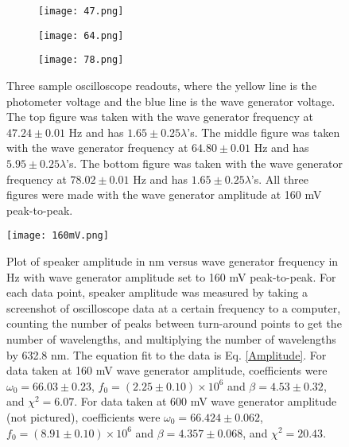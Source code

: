 \documentclass[11pt,letterpaper]{article}
\begin{document}
\begin{figure}[hp]
    \centering
    \begin{subfigure}[b]{0.55\textwidth}
        \texttt{[image: 47.png]}
        \label{fig:subfigA}
    \end{subfigure}
    \begin{subfigure}[b]{0.55\textwidth}
        \texttt{[image: 64.png]}
        \label{fig:subfigB}
    \end{subfigure}
    \begin{subfigure}[b]{0.55\textwidth}
        \texttt{[image: 78.png]}
        \label{fig:subfigB}
    \end{subfigure}
    \caption{Three sample oscilloscope readouts, where the yellow line is the photometer voltage and the blue line is the wave generator voltage. The top figure was taken with the wave generator frequency at $47.24 \pm 0.01$ Hz and has $1.65 \pm 0.25 \lambda$'s. The middle figure was taken with the wave generator frequency at $64.80 \pm 0.01$ Hz and has $5.95 \pm 0.25 \lambda$'s. The bottom figure was taken with the wave generator frequency at $78.02 \pm 0.01$ Hz and has $1.65 \pm 0.25 \lambda$'s. All three figures were made with the wave generator amplitude at 160 mV peak-to-peak.}
    \label{Sample readouts}
\end{figure}

\begin{figure}[hp]
    \centering
        \texttt{[image: 160mV.png]}
    \caption{Plot of speaker amplitude in nm versus wave generator frequency in Hz with wave generator amplitude set to 160 mV peak-to-peak. For each data point, speaker amplitude was measured by taking a screenshot of oscilloscope data at a certain frequency to a computer, counting the number of peaks between turn-around points to get the number of wavelengths, and multiplying the number of wavelengths by 632.8 nm. The equation fit to the data is Eq. \eqref{Amplitude}. For data taken at 160 mV wave generator amplitude, coefficients were $\omega _0 = 66.03 \pm 0.23$, $f_0 = (2.25 \pm 0.10) \times 10^6$ and $\beta = 4.53 \pm 0.32$, and $\chi ^2 = 6.07$. For data taken at 600 mV wave generator amplitude (not pictured), coefficients were $\omega _0 = 66.424 \pm 0.062$, $f_0 = (8.91 \pm 0.10) \times 10^6$ and $\beta = 4.357 \pm 0.068$, and $\chi ^2 = 20.43$.}
    \label{Sample readouts}
\end{figure}
\end{document}
